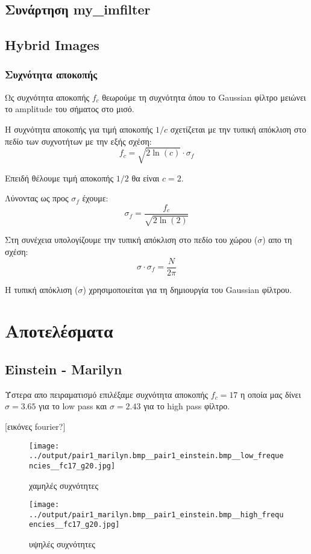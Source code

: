 \documentclass[11pt]{scrartcl} %
\begin{document}
\subsection{Συνάρτηση my\_imfilter}


\subsection{Hybrid Images}

\subsubsection{Συχνότητα αποκοπής}

Ως συχνότητα αποκοπής $f_c$ θεωρούμε τη συχνότητα όπου το Gaussian φίλτρο μειώνει το amplitude του σήματος στο μισό.

Η συχνότητα αποκοπής για τιμή αποκοπής $1/c$ σχετίζεται με την τυπική απόκλιση στο πεδίο των συχνοτήτων με την εξής σχέση:
\[f_c = \sqrt{2\ln(c)}\cdot\sigma_f\]

Επειδή θέλουμε τιμή αποκοπής $1/2$ θα είναι $c = 2$.

Λύνοντας ως προς $\sigma_f$ έχουμε:
\[\sigma_f = \frac{f_c}{\sqrt{2\ln(2)}}\]

Στη συνέχεια υπολογίζουμε την τυπική απόκλιση στο πεδίο του χώρου ($\sigma$) απο τη σχέση:
\[\sigma\cdot\sigma_f=\frac{N}{2\pi}\]

Η τυπική απόκλιση ($\sigma$) χρησιμοποιείται για τη δημιουργία του Gaussian φίλτρου.

\section{Αποτελέσματα}

\subsection{Einstein - Marilyn}

Ύστερα απο πειραματισμό επιλέξαμε συχνότητα αποκοπής $f_c = 17$ η οποία μας δίνει $\sigma = 3.65$ για το low pass και $\sigma = 2.43$ για το high pass φίλτρο.

[εικόνες fourier?]
\begin{figure}[H]
  \begin{minipage}[c]{9cm}
    \texttt{[image: ../output/pair1\_marilyn.bmp\_\_pair1\_einstein.bmp\_\_low\_frequencies\_\_fc17\_g20.jpg]}
    \caption{χαμηλές συχνότητες}
  \end{minipage}
  \begin{minipage}[c]{9cm}
    \texttt{[image: ../output/pair1\_marilyn.bmp\_\_pair1\_einstein.bmp\_\_high\_frequencies\_\_fc17\_g20.jpg]}
    \caption{υψηλές συχνότητες}
  \end{minipage}
\end{figure}
\end{document}
